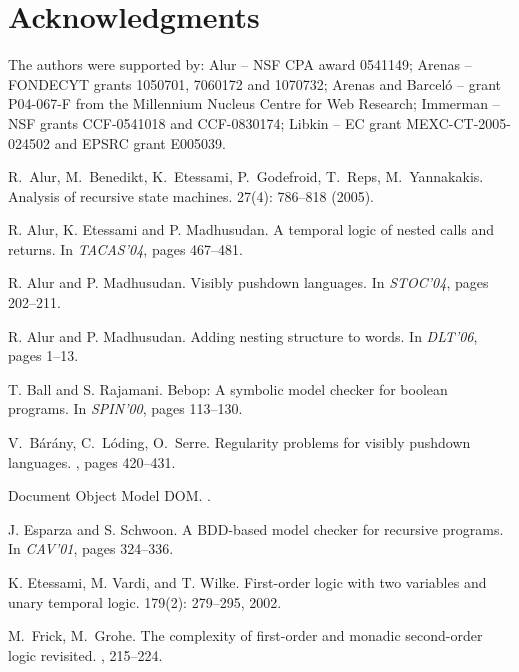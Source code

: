 \documentclass{LMCS}
\theoremstyle{plain}
\theoremstyle{definition}
\begin{document}
\section*{Acknowledgments}
\noindent The authors were supported by: Alur -- NSF CPA award 0541149; Arenas
-- \mbox{FONDECYT} grants 1050701, 7060172 and 1070732; Arenas and Barcel\'o
-- grant P04-067-F from the Millennium Nucleus Centre for Web
Research; Immerman -- NSF grants CCF-0541018 and CCF-0830174; Libkin
-- EC grant MEXC-CT-2005-024502 and EPSRC grant E005039.

\begin{thebibliography}{99}



R.~Alur, M.~Benedikt, K.~Etessami, P.~Godefroid, T.~Reps, M.~Yannakakis.
\newblock Analysis of recursive state machines. 
 27(4): 786--818 (2005). 

R. Alur, K. Etessami and P. Madhusudan. 
\newblock A temporal logic of nested calls and returns.  
\newblock In {\em TACAS'04}, pages 467--481.  

R. Alur and P. Madhusudan. 
\newblock Visibly pushdown languages.  
\newblock In {\em STOC'04}, pages 202--211. 

R. Alur and P. Madhusudan. 
\newblock Adding nesting structure to words.  
\newblock In {\em DLT'06}, pages 1--13.

T. Ball and S. Rajamani.
\newblock Bebop: A symbolic model checker for boolean programs.
\newblock In {\em SPIN'00}, pages 113--130.

V.~B\'ar\'any, C.~L\'oding, O.~Serre.
\newblock  Regularity problems for visibly pushdown languages. 
, pages 420--431. 

Document Object Model DOM.
.

J. Esparza and S. Schwoon.
\newblock A BDD-based model checker for recursive programs.
\newblock In {\em CAV'01},
pages {324--336}. 


K. Etessami, M. Vardi, and T. Wilke. 
\newblock First-order logic with two variables and unary temporal
logic.  
 179(2): 279--295, 2002.   

M.~Frick, M.~Grohe.
\newblock  The complexity of first-order and monadic second-order
logic revisited. 
, 215--224. 



\end{thebibliography}
\end{document}
